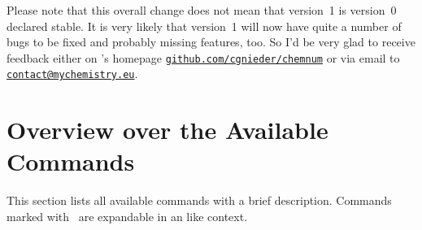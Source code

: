 \documentclass[load-preamble+,babel-options={ngerman,british,american}]{cnltx-doc}
\newcommand*\email[1]{\texttt{\href{mailto:#1}{#1}}}
\newcommand*\securewebsite[1]{\texttt{\href{https://#1/}{#1}}}
\begin{document}
Please note that this overall change does not mean that version~1 is version~0
declared stable.  It is very likely that version~1 will now have quite a
number of bugs to be fixed and probably missing features, too.  So I'd be very
glad to receive feedback either on \chemnum's homepage
\securewebsite{github.com/cgnieder/chemnum} or via email to
\email{contact@mychemistry.eu}.

\section{Overview over the Available Commands}\label{sec:overv-over-avail}

This section lists all available commands with a brief description.  Commands
marked with \expandablesign\ are expandable in an  like context.
\end{document}
